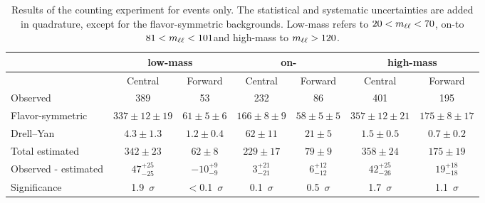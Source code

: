 
\begin{table}[hbtp]
 \renewcommand{\arraystretch}{1.3}
 \setlength{\belowcaptionskip}{6pt}
 \scriptsize
 \centering
 \caption{Results of the counting experiment for \EE events only.
     The statistical and systematic uncertainties are added in quadrature, except for the flavor-symmetric backgrounds.
     Low-mass refers to $20 < m_{\ell\ell} < 70$\GeV, on-\Z to  $81 < m_{\ell\ell} < 101$\GeV and high-mass to $m_{\ell\ell} > 120$\GeV.
     }
  \label{tab:METresults2012EE}
  \begin{tabular}{l| cc | cc | cc}

    							& \multicolumn{2}{c}{low-mass} & \multicolumn{2}{c}{on-\Z} & \multicolumn{2}{c}{high-mass} \\ 

    \hline
                                &  Central        & Forward  &  Central  & Forward   &  Central        & Forward \\ 

    \hline
        Observed       &  389                   & 53              &  232            &  86       &   401           &   195    \\

    \hline
        Flavor-symmetric    & $337\pm12\pm19$        & $61\pm5\pm6$  &  $166\pm8\pm9$ & $58\pm5\pm5$ & $357\pm12\pm21$ & $175\pm8\pm17$ \\

            Drell--Yan          & $4.3\pm1.3$            & $1.2\pm0.4$      & $62\pm11$ & $21\pm5$ & $1.5\pm0.5$ & $0.7\pm0.2$ \\

    \hline
            Total estimated          & $342\pm23$            & $62\pm8$      & $229\pm17$ & $79\pm9$ & $358\pm24$ & $175\pm19$ \\

    \hline
         Observed - estimated  & $47^{+25}_{-25}$      & $-10^{+9}_{-9}$ & $3^{+21}_{-21} $ & $6^{+12}_{-12}$ & $42^{+25}_{-26}$ & $19^{+18}_{-18} $ \\ 

    \hline
   Significance      & 1.9~$\sigma$    &  $<$0.1~$\sigma$  & 0.1~$\sigma$ & 0.5~$\sigma$ & 1.7~$\sigma$ & 1.1~$\sigma$ \\ 


  \end{tabular}
\end{table}



